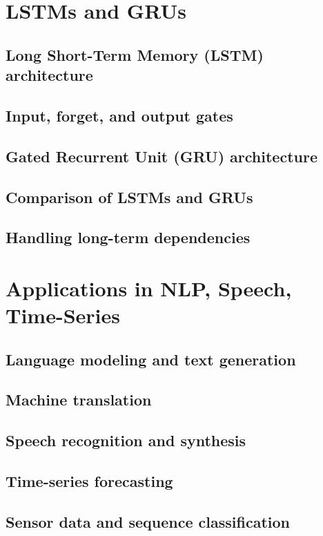 \section{LSTMs and GRUs}
\subsection{Long Short-Term Memory (LSTM) architecture}
\subsection{Input, forget, and output gates}
\subsection{Gated Recurrent Unit (GRU) architecture}
\subsection{Comparison of LSTMs and GRUs}
\subsection{Handling long-term dependencies}

\section{Applications in NLP, Speech, Time-Series}
\subsection{Language modeling and text generation}
\subsection{Machine translation}
\subsection{Speech recognition and synthesis}
\subsection{Time-series forecasting}
\subsection{Sensor data and sequence classification}


